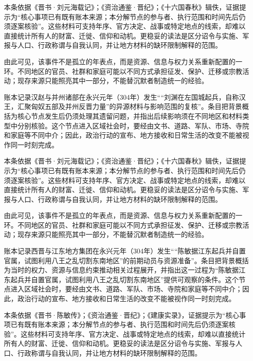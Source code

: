 本条依据《晋书·刘元海载记》；《资治通鉴·晋纪》；《十六国春秋》辑佚，证据提示为“核心事项已有既有账本来源；本分解节点的参与者、执行范围和时间先后仍须逐案核验”。这些材料可支持年序、官方决定、战事或特定地点的线索，却难以直接统计所有人的财富、迁徙、信仰和动机。更稳妥的读法是区分诏令与实施、军报与人口、行政称谓与自我认同，并让地方材料的缺环限制解释的范围。

由此可见，该事件不是孤立的年表点，而是资源、信息与权力关系重新配置的一环。不同地区的官员、社群和家庭可能以不同方式承担征发、保护、迁移或宗教活动；现存来源只能照亮其中一部分，不能替沉默者制造统一的经验。

账本记录汉赵与并州诸部在永兴元年（304年）发生““刘渊在左国城起兵，自称汉王，汇聚匈奴五部及并州反晋力量”的异源材料与影响范围的复核”。条目把背景概括为核心节点发生后仍须处理其遗留问题，并指出后续影响须在不同地区和材料类型中分别核验。这个节点进入区域社会时，要经由文书、道路、军队、市场、寺院和家庭等不同中介；因此，政治行动的宣布、地方接收和日常生活的改变不能被视作同一时刻完成。

本条依据《晋书·刘元海载记》；《资治通鉴·晋纪》；《十六国春秋》辑佚，证据提示为“核心事项已有既有账本来源；本分解节点的参与者、执行范围和时间先后仍须逐案核验”。这些材料可支持年序、官方决定、战事或特定地点的线索，却难以直接统计所有人的财富、迁徙、信仰和动机。更稳妥的读法是区分诏令与实施、军报与人口、行政称谓与自我认同，并让地方材料的缺环限制解释的范围。

由此可见，该事件不是孤立的年表点，而是资源、信息与权力关系重新配置的一环。不同地区的官员、社群和家庭可能以不同方式承担征发、保护、迁移或宗教活动；现存来源只能照亮其中一部分，不能替沉默者制造统一的经验。

账本记录西晋与江东地方集团在永兴元年（304年）发生““陈敏据江东起兵并自置官属，试图利用八王之乱切割东南地区”的前期动员与资源准备”。条目把背景概括为当时的权力、资源与信息约束推动相关过程展开，并指出这一过程为“陈敏据江东起兵并自置官属，试图利用八王之乱切割东南地区”提供可观察的条件。这个节点进入区域社会时，要经由文书、道路、军队、市场、寺院和家庭等不同中介；因此，政治行动的宣布、地方接收和日常生活的改变不能被视作同一时刻完成。

本条依据《晋书·陈敏传》；《资治通鉴·晋纪》；《建康实录》，证据提示为“核心事项已有既有账本来源；本分解节点的参与者、执行范围和时间先后仍须逐案核验”。这些材料可支持年序、官方决定、战事或特定地点的线索，却难以直接统计所有人的财富、迁徙、信仰和动机。更稳妥的读法是区分诏令与实施、军报与人口、行政称谓与自我认同，并让地方材料的缺环限制解释的范围。

